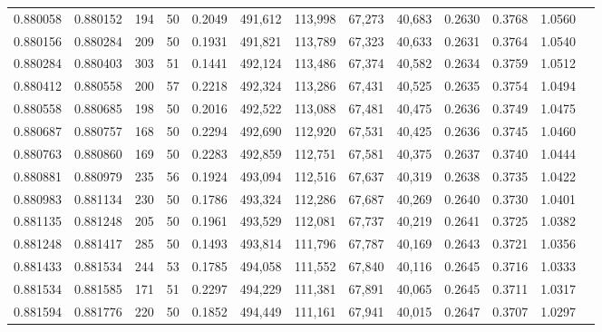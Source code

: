\begin{tabular}{rrrrrrrrrrrrr}
0.880058 & 0.880152 &   194 &  50 &                                     0.2049 & 491,612 & 113,998 &  67,273 &  40,683 & 0.2630 & 0.3768 & 1.0560 \\
0.880156 & 0.880284 &   209 &  50 &                                     0.1931 & 491,821 & 113,789 &  67,323 &  40,633 & 0.2631 & 0.3764 & 1.0540 \\
0.880284 & 0.880403 &   303 &  51 &                                     0.1441 & 492,124 & 113,486 &  67,374 &  40,582 & 0.2634 & 0.3759 & 1.0512 \\
0.880412 & 0.880558 &   200 &  57 &                                     0.2218 & 492,324 & 113,286 &  67,431 &  40,525 & 0.2635 & 0.3754 & 1.0494 \\
0.880558 & 0.880685 &   198 &  50 &                                     0.2016 & 492,522 & 113,088 &  67,481 &  40,475 & 0.2636 & 0.3749 & 1.0475 \\
0.880687 & 0.880757 &   168 &  50 &                                     0.2294 & 492,690 & 112,920 &  67,531 &  40,425 & 0.2636 & 0.3745 & 1.0460 \\
0.880763 & 0.880860 &   169 &  50 &                                     0.2283 & 492,859 & 112,751 &  67,581 &  40,375 & 0.2637 & 0.3740 & 1.0444 \\
0.880881 & 0.880979 &   235 &  56 &                                     0.1924 & 493,094 & 112,516 &  67,637 &  40,319 & 0.2638 & 0.3735 & 1.0422 \\
0.880983 & 0.881134 &   230 &  50 &                                     0.1786 & 493,324 & 112,286 &  67,687 &  40,269 & 0.2640 & 0.3730 & 1.0401 \\
0.881135 & 0.881248 &   205 &  50 &                                     0.1961 & 493,529 & 112,081 &  67,737 &  40,219 & 0.2641 & 0.3725 & 1.0382 \\
0.881248 & 0.881417 &   285 &  50 &                                     0.1493 & 493,814 & 111,796 &  67,787 &  40,169 & 0.2643 & 0.3721 & 1.0356 \\
0.881433 & 0.881534 &   244 &  53 &                                     0.1785 & 494,058 & 111,552 &  67,840 &  40,116 & 0.2645 & 0.3716 & 1.0333 \\
0.881534 & 0.881585 &   171 &  51 &                                     0.2297 & 494,229 & 111,381 &  67,891 &  40,065 & 0.2645 & 0.3711 & 1.0317 \\
0.881594 & 0.881776 &   220 &  50 &                                     0.1852 & 494,449 & 111,161 &  67,941 &  40,015 & 0.2647 & 0.3707 & 1.0297 \\

\end{tabular}
